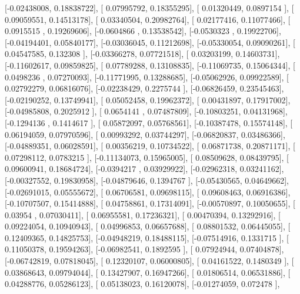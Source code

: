 \documentclass{article}
\begin{document}
       [-0.02438008,  0.18838722],
       [ 0.07995792,  0.18355295],
       [ 0.01320449,  0.0897154 ],
       [ 0.09059551,  0.14513178],
       [ 0.03340504,  0.20982764],
       [ 0.02177416,  0.11077466],
       [ 0.0915515 ,  0.19269606],
       [-0.0604866 ,  0.13538542],
       [-0.0530323 ,  0.19922706],
       [-0.04194401,  0.05840177],
       [-0.03036045,  0.11212698],
       [-0.05330054,  0.09090261],
       [ 0.04547585,  0.132308  ],
       [-0.03366278,  0.07721518],
       [ 0.03203199,  0.14603731],
       [-0.11602617,  0.09859825],
       [ 0.07789288,  0.13108835],
       [-0.11069735,  0.15064344],
       [ 0.0498236 ,  0.07270093],
       [-0.11771995,  0.13288685],
       [-0.05062926,  0.09922589],
       [ 0.02792279,  0.06816076],
       [-0.02238429,  0.2275744 ],
       [-0.06826459,  0.23545463],
       [-0.02190252,  0.13749941],
       [ 0.05052458,  0.19962372],
       [ 0.00431897,  0.17917002],
       [-0.04985808,  0.2025912 ],
       [ 0.0654141 ,  0.07487809],
       [-0.10803251,  0.04131968],
       [-0.1294136 ,  0.1414617 ],
       [ 0.05872097,  0.05768561],
       [-0.10387478,  0.15574148],
       [ 0.06194059,  0.07970596],
       [ 0.00993292,  0.03744297],
       [-0.06820837,  0.03486366],
       [-0.04889351,  0.06028591],
       [ 0.00356219,  0.10734522],
       [ 0.06871738,  0.20871171],
       [ 0.07298112,  0.0783215 ],
       [-0.11134073,  0.15965005],
       [ 0.08509628,  0.08439795],
       [ 0.09600941,  0.18684724],
       [-0.0394217 ,  0.03929922],
       [-0.02962318,  0.03241162],
       [-0.00327552,  0.19830958],
       [-0.04879646,  0.1394767 ],
       [-0.05430565,  0.04649662],
       [-0.02691015,  0.05555672],
       [ 0.06706581,  0.09698115],
       [ 0.09608463,  0.06916386],
       [-0.10707507,  0.15414888],
       [ 0.04758861,  0.17314091],
       [-0.00570897,  0.10050655],
       [ 0.03954   ,  0.07030411],
       [ 0.06955581,  0.17236321],
       [ 0.00470394,  0.13292916],
       [ 0.09224054,  0.10940943],
       [ 0.04996853,  0.06657688],
       [ 0.08801532,  0.06445055],
       [ 0.12409365,  0.14825753],
       [-0.04948219,  0.18488115],
       [-0.07514916,  0.1331715 ],
       [ 0.11050378,  0.19594263],
       [-0.06982541,  0.1892595 ],
       [ 0.07924944,  0.07404878],
       [-0.06742819,  0.07818045],
       [ 0.12320107,  0.06000805],
       [ 0.04161522,  0.1480349 ],
       [ 0.03868643,  0.09794044],
       [ 0.13427907,  0.16947266],
       [ 0.01806514,  0.06531886],
       [ 0.04288776,  0.05286123],
       [ 0.05138023,  0.16120078],
       [-0.01274059,  0.072478  ],
\end{document}

